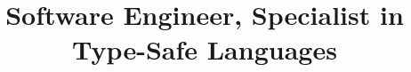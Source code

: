 \usepackage{fontspec}


\usepackage[scale=0.75]{geometry}
\setlength{\hintscolumnwidth}{20ex} %

\usepackage{xspace}

\usepackage[super]{nth}

\usepackage{enumitem}



\title{Software Engineer, Specialist in Type-Safe Languages}
